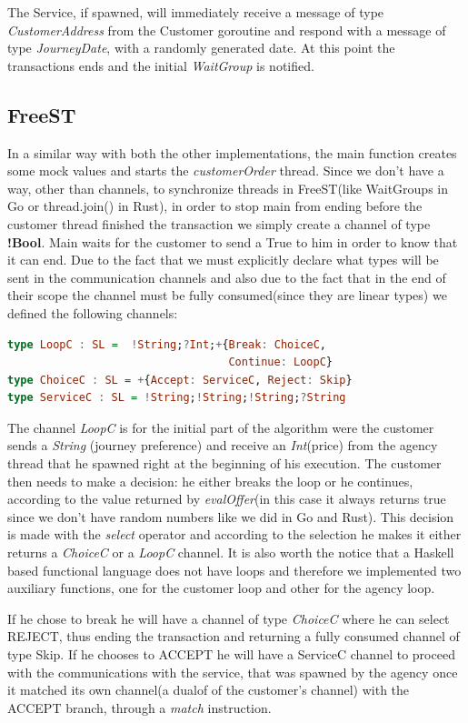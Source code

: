 \documentclass[runningheads]{llncs}
\begin{document}
The Service, if spawned, will immediately receive a message of type {\it CustomerAddress} from the Customer goroutine and respond with a message of type {\it JourneyDate}, with a randomly generated date. At this point the transactions ends and the initial {\it WaitGroup} is notified.
\subsection{FreeST}
In a similar way with both the other implementations, the main function creates some mock values and starts the {\it customerOrder} thread. Since we don't have a way, other than channels, to synchronize threads in FreeST(like WaitGroups in Go or thread.join() in Rust), in order to stop main from ending before the customer thread finished the transaction we simply create a channel of type {\bf !Bool}. Main waits for the customer to send a True to him in order to know that it can end.
Due to the fact that we must explicitly declare what types will be sent in the communication channels and also due to the fact that in the end of their scope the channel must be fully consumed(since they are linear types) we defined the following channels:
\begin{lstlisting}[language=haskell]
type LoopC : SL =  !String;?Int;+{Break: ChoiceC, 
								  Continue: LoopC}
type ChoiceC : SL = +{Accept: ServiceC, Reject: Skip}
type ServiceC : SL = !String;!String;!String;?String
\end{lstlisting}
The channel {\it LoopC} is for the initial part of the algorithm were the customer sends a {\it String} (journey preference) and receive an {\it Int}(price) from the agency thread that he spawned right at the beginning of his execution. The customer then needs to make a decision: he either breaks the loop or he continues, according to the value returned by {\it evalOffer}(in this case it always returns true since we don't have random numbers like we did in Go and Rust). This decision is made with the {\it select} operator and according to the selection he makes it either returns a {\it ChoiceC} or a {\it LoopC} channel. It is also worth the notice that a Haskell based functional language does not have loops and therefore we implemented two auxiliary functions, one for the customer loop and other for the agency loop.

If he chose to break he will have a channel of type {\it ChoiceC} where he can select REJECT, thus ending the transaction and returning a fully consumed channel of type Skip. If he chooses to ACCEPT he will have a ServiceC channel to proceed with the communications with the service, that was spawned by the agency once it matched its own channel(a dualof of the customer's channel) with the ACCEPT branch, through a {\it match} instruction.
\end{document}
